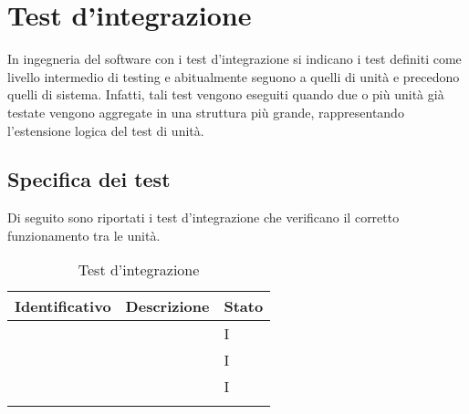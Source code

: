 \section{Test d'integrazione}\label{sec:test-d'integrazione}
In ingegneria del software con i test d'integrazione si indicano i test definiti come livello intermedio di testing e abitualmente seguono a quelli di unità e precedono quelli di sistema.
Infatti, tali test vengono eseguiti quando due o più unità già testate vengono aggregate in una struttura più grande, rappresentando l'estensione logica del test di unità.

\setcounter{rowcount}{0}

\subsection{Specifica dei test}\label{subsec:specifica-dei-test-integrazione}
Di seguito sono riportati i test d'integrazione che verificano il corretto funzionamento tra le unità.
\begin{center}
    \begin{longtable}{ |C{3cm} | C{8.5cm}| C{1.5cm} |}
        \hline
        \textbf{Identificativo} &
        \textbf{Descrizione} &
        \textbf{Stato} \\\hline
         & & I \\\hline
         & & I \\\hline
         & & I \\\hline
        \caption{Test d'integrazione}
    \end{longtable}
\end{center}
\setcounter{rowcount}{0}

